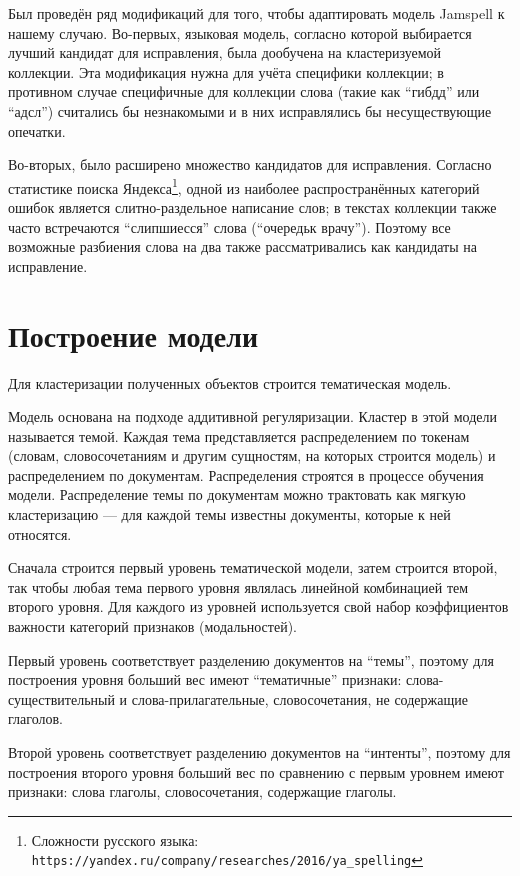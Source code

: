 \par Был проведён ряд модификаций для того, чтобы адаптировать модель Jamspell к нашему случаю. Во-первых, языковая модель, согласно которой выбирается лучший кандидат для исправления, была дообучена на кластеризуемой коллекции. Эта модификация нужна для учёта специфики коллекции; в противном случае специфичные для коллекции слова (такие как ``гибдд'' или ``адсл'') считались бы незнакомыми и в них исправлялись бы несуществующие опечатки.

Во-вторых, было расширено множество кандидатов для исправления. Согласно статистике поиска Яндекса\footnote{Сложности русского языка: \texttt{https://yandex.ru/company/researches/2016/ya\_spelling}}, одной из наиболее распространённых категорий ошибок является слитно-раздельное написание слов; в текстах коллекции также часто встречаются ``слипшиесся'' слова (``очередьк врачу''). Поэтому все возможные разбиения слова на два также рассматривались как кандидаты на исправление.

\section{Построение модели}

Для кластеризации полученных объектов строится тематическая модель. 

Модель основана на подходе аддитивной регуляризации. Кластер в этой модели называется темой. Каждая тема представляется распределением по токенам (словам, словосочетаниям и другим сущностям, на которых строится модель) и распределением по документам. Распределения строятся в процессе обучения модели. Распределение темы по документам можно трактовать как мягкую кластеризацию — для каждой темы известны документы, которые к ней относятся.  

Сначала строится первый уровень тематической модели, затем строится второй, так чтобы любая тема первого уровня являлась линейной комбинацией тем второго уровня. Для каждого из уровней используется свой набор коэффициентов важности категорий признаков (модальностей). 

Первый уровень соответствует разделению документов на “темы”, поэтому для построения уровня больший вес имеют “тематичные” признаки: слова-существительный и слова-прилагательные, словосочетания, не содержащие глаголов. 

Второй уровень соответствует разделению документов на “интенты”, поэтому для построения второго уровня больший вес по сравнению с первым уровнем имеют признаки: слова глаголы, словосочетания, содержащие глаголы.

